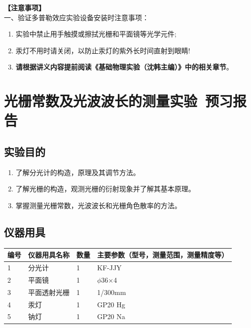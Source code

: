 \documentclass[dvipsnames, svgnames,a4paper,11pt]{article}
\begin{document}
\textbf{【注意事项】}\\
一、验证多普勒效应实验设备安装时注意事项：
\begin{enumerate}
    \item 实验中{\color{red}禁止用手触摸或擦拭光栅和平面镜等光学元件};
    \item 汞灯不用时请关闭，以{\color{red}防止汞灯的紫外长时间直射到眼睛}!
    \item \textbf{\color{red}请根据讲义内容提前阅读《基础物理实验（沈韩主编）》中的相关章节}。
\end{enumerate}

\clearpage
\tableofcontents
\clearpage

\setcounter{section}{0}
\section{光栅常数及光波波长的测量实验\ \textbf{预习报告}}
	
\subsection{实验目的}
\begin{enumerate}
    \item 了解分光计的构造，原理及其调节方法。
	\item 了解光栅的构造，观测光栅的衍射现象并了解其基本原理。
	\item 掌握测量光栅常数，光波波长和光栅角色散率的方法。
\end{enumerate}
\subsection{仪器用具}
\begin{table}[htbp]
	\centering
	\renewcommand\arraystretch{1.6}
	\begin{tabular}{p{}|p{}|p{}|p{}}
	\hline
	编号& 仪器用具名称 & 数量 &  主要参数（型号，测量范围，测量精度等） \\
	\hline
	1&分光计&1 &KF-JJY\\
	\hline
	2&平面镜 &1&$\phi$36×4\\
	\hline
	3&平面透射光栅&1&1/300mm\\
	\hline
	4&汞灯&1&GP20 Hg\\
	\hline
	5&钠灯&1&GP20 Na\\
	\hline
\end{tabular}
\end{table}
\end{document}
